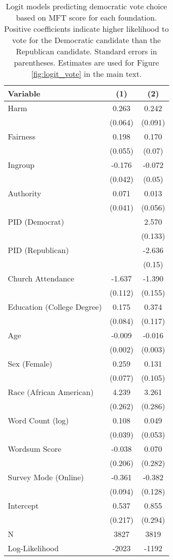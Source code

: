 \begin{table}[ht]
\centering
\caption{Logit models predicting democratic vote choice based on
           MFT score for each foundation. Positive coefficients indicate higher likelihood
           to vote for the Democratic candidate than the Republican candidate. Standard errors 
           in parentheses. Estimates are used for Figure \ref{fig:logit_vote} in the main text.} 
\label{tab:logit_vote}
\begingroup\footnotesize
\begin{tabular}{lcc}
  \hline
Variable & (1) & (2) \\ 
  \hline
Harm &  0.263 &  0.242 \\ 
   & (0.064) & (0.091) \\ 
  Fairness &  0.198 &  0.170 \\ 
   & (0.055) & (0.07) \\ 
  Ingroup & -0.176 & -0.072 \\ 
   & (0.042) & (0.05) \\ 
  Authority &  0.071 &  0.013 \\ 
   & (0.041) & (0.056) \\ 
  PID (Democrat) &  &  2.570 \\ 
   &  & (0.133) \\ 
  PID (Republican) &  & -2.636 \\ 
   &  & (0.15) \\ 
  Church Attendance & -1.637 & -1.390 \\ 
   & (0.112) & (0.155) \\ 
  Education (College Degree) &  0.175 &  0.374 \\ 
   & (0.084) & (0.117) \\ 
  Age & -0.009 & -0.016 \\ 
   & (0.002) & (0.003) \\ 
  Sex (Female) &  0.259 &  0.131 \\ 
   & (0.077) & (0.105) \\ 
  Race (African American) &  4.239 &  3.261 \\ 
   & (0.262) & (0.286) \\ 
  Word Count (log) &  0.108 &  0.049 \\ 
   & (0.039) & (0.053) \\ 
  Wordsum Score & -0.038 &  0.070 \\ 
   & (0.206) & (0.282) \\ 
  Survey Mode (Online) & -0.361 & -0.382 \\ 
   & (0.094) & (0.128) \\ 
  Intercept &  0.537 &  0.855 \\ 
   & (0.217) & (0.294) \\ 
   \hline
N & 3827 & 3819 \\ 
  Log-Likelihood & -2023 & -1192 \\ 
   \hline
\end{tabular}
\endgroup
\end{table}
